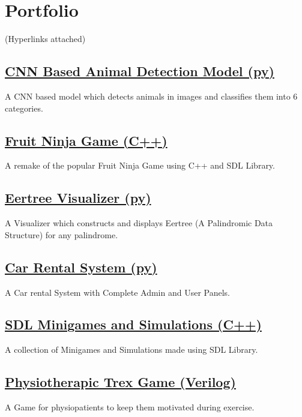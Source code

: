 \documentclass[]{m abbas resume' 2022}
\begin{document}
\begin{minipage}[t]{0.45\textwidth}
\section{Portfolio} 
    (Hyperlinks attached)

    \subsection{\href{https://github.com/smabbasht/CNN-Based-Animal-Detector}{\textbf{CNN Based Animal Detection Model (py)}}}%
    A CNN based model which detects animals in images and classifies them into 6 categories.

    \subsection{\href{https://github.com/smabbasht/Fruit-Ninja-Desktop-Game}{\textbf{Fruit Ninja Game (C++)}}}%
    A remake of the popular Fruit Ninja Game using C++ and SDL Library.

    \subsection{\href{https://github.com/smabbasht/Eertree-Visualizer}{\textbf{Eertree Visualizer (py)}}}%
    A Visualizer which constructs and displays Eertree (A Palindromic Data Structure) for any palindrome.

    \subsection{\href{https://github.com/smabbasht/Car-Rental-System}{\textbf{Car Rental System (py)}}}%
    A Car rental System with Complete Admin and User Panels.

    \subsection{\href{https://github.com/smabbasht/SDL-Minigames-and-Simulations}{\textbf{SDL Minigames and Simulations (C++)}}}%
    A collection of Minigames and Simulations made using SDL Library.

    \subsection{\href{https://github.com/smabbasht/Physiotherapic-Trex-Game}{\textbf{Physiotherapic Trex Game (Verilog)}}}%
    A Game for physiopatients to keep them motivated during exercise.
    

\end{minipage}
\end{document}
